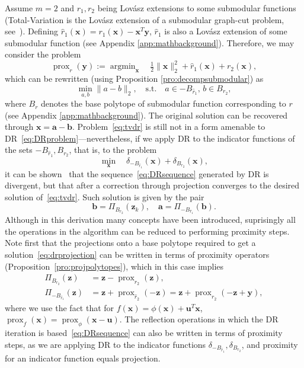 \documentclass[twoside,11pt]{article}
\newcommand{\va}{\bm{a}}       \newcommand{\vah}{\hat{\bm{a}}}        \newcommand{\ah}{\hat{a}}    \newcommand{\vat}{\tilde{\bm{a}}}       \newcommand{\at}{\tilde{a}}
\newcommand{\vb}{\bm{b}}       \newcommand{\vbh}{\hat{\bm{b}}}        \newcommand{\bh}{\hat{b}}    \newcommand{\vbt}{\tilde{\bm{b}}}       \newcommand{\bt}{\tilde{b}}
\newcommand{\vu}{\bm{u}}       \newcommand{\vuh}{\hat{\bm{u}}}        \newcommand{\uh}{\hat{u}}    \newcommand{\vut}{\tilde{\bm{u}}}       \newcommand{\ut}{\tilde{u}}
\newcommand{\vx}{\bm{x}}       \newcommand{\vxh}{\hat{\bm{x}}}        \newcommand{\xh}{\hat{x}}    \newcommand{\vxt}{\tilde{\bm{x}}}       \newcommand{\xt}{\tilde{x}}
\newcommand{\vy}{\bm{y}}       \newcommand{\vyh}{\hat{\bm{y}}}        \newcommand{\yh}{\hat{y}}    \newcommand{\vyt}{\tilde{\bm{y}}}       \newcommand{\yt}{\tilde{y}}
\newcommand{\vz}{\bm{z}}       \newcommand{\vzh}{\hat{\bm{z}}}        \newcommand{\zh}{\hat{z}}    \newcommand{\vzt}{\tilde{\bm{z}}}       \newcommand{\zt}{\tilde{z}}
\newcommand{\mynorm}[2]{\| {#1} \|_{#2}}
\newcommand{\enorm}[1]{\mynorm{#1}{2}}
\DeclareMathOperator*{\argmin}{argmin}
\DeclareMathOperator{\prox}{prox}
\newcommand{\half}{\tfrac{1}{2}}
\numberwithin{equation}{section}
\numberwithin{theorem}{section}
\begin{document}
Assume $m=2$ and $r_1, r_2$ being Lovász extensions to some submodular functions (Total-Variation is the Lovász extension of a submodular graph-cut problem, see~\citet{Bach13}). Defining $\hat r_1(\vx) = r_1(\vx) - \vx^T \vy$, $\hat r_1$ is also a Lovász extension of some submodular function (see Appendix \ref{app:mathbackground}). Therefore, we may consider the problem
\begin{equation*}
 \prox_r(\vy) := \argmin_{\vx}\quad \half\enorm{\vx}^2 + \hat r_1(\vx) + r_2(\vx),
\end{equation*}
which can be rewritten (using Proposition \ref{pro:decompsubmodular}) as
\begin{equation}
 \label{eq:tvdr}
 \min_{a, b} \enorm{a - b},
  \quad \text{s.t.} \quad a \in -B_{\hat r_1}, \, b \in B_{r_2},
\end{equation}
where $B_r$ denotes the base polytope of submodular function corresponding to $r$ (see Appendix \ref{app:mathbackground}). The original solution can be recovered through $\vx = \va - \vb$. Problem~\eqref{eq:tvdr} is still not in a form amenable to DR~\eqref{eq:DRproblem}---nevertheless, if we apply DR to the indicator functions of the sets $-B_{\hat r_1}, B_{r_2}$, that is, to the problem
\begin{equation*}
 \min_{\vx} \quad \delta_{-B_{\hat r_1}}(\vx) + \delta_{B_{r_2}}(\vx),
\end{equation*}
it can be shown~\citep{Bauschke04} that the sequence~\eqref{eq:DRsequence} generated by DR is divergent, but that after a correction through projection converges to the desired solution of~\eqref{eq:tvdr}. Such solution is given by the pair
\begin{equation}
 \label{eq:drprojection}
 \vb = \Pi_{B_{r_2}}(\vz_k), \quad
 \va = \Pi_{-B_{\hat r_1}}(\vb).
\end{equation}
Although in this derivation many concepts have been introduced, suprisingly all the operations in the algorithm can be reduced to performing proximity steps. Note first that the projections onto a base polytope required to get a solution~\eqref{eq:drprojection} can be written in terms of proximity operators (Proposition~\ref{pro:projpolytopes}), which in this case implies
\begin{align*}
 \Pi_{B_{r_2}}(\vz) &= \vz - \prox_{r_2}(\vz), \\
 \Pi_{-B_{\hat r_1}}(\vz) &= \vz + \prox_{\hat r_2}(-\vz) = \vz + \prox_{r_2}(-\vz + \vy),
\end{align*}
where we use the fact that for $f(\vx) = \phi(\vx) + \vu^T \vx$, $\prox_f(\vx) = \prox_{\phi}(\vx - \vu)$. The reflection operations in which the DR iteration is based~\eqref{eq:DRsequence} can also be written in terms of proximity steps, as we are applying DR to the indicator functions $\delta_{-B_{\hat r_1}}, \delta_{B_{r_2}}$, and proximity for an indicator function equals projection. %
\end{document}
